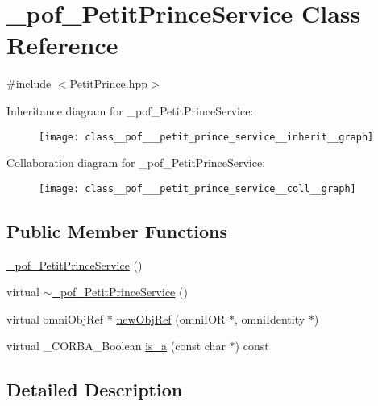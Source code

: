 \hypertarget{class__pof___petit_prince_service}{}\section{\+\_\+pof\+\_\+\+Petit\+Prince\+Service Class Reference}
\label{class__pof___petit_prince_service}


{\ttfamily \#include $<$Petit\+Prince.\+hpp$>$}



Inheritance diagram for \+\_\+pof\+\_\+\+Petit\+Prince\+Service\+:
\nopagebreak
\begin{figure}[H]
\begin{center}
\leavevmode
\texttt{[image: class\_\_pof\_\_\_petit\_prince\_service\_\_inherit\_\_graph]}
\end{center}
\end{figure}


Collaboration diagram for \+\_\+pof\+\_\+\+Petit\+Prince\+Service\+:
\nopagebreak
\begin{figure}[H]
\begin{center}
\leavevmode
\texttt{[image: class\_\_pof\_\_\_petit\_prince\_service\_\_coll\_\_graph]}
\end{center}
\end{figure}
\subsection*{Public Member Functions}
\begin{DoxyCompactItemize}
\item 
\hyperlink{class__pof___petit_prince_service_a7a0313a18bc00a15e942f157f91b71a4}{\+\_\+pof\+\_\+\+Petit\+Prince\+Service} ()
\item 
virtual \hyperlink{class__pof___petit_prince_service_a6b090844c1622edbfc710950015af98f}{$\sim$\+\_\+pof\+\_\+\+Petit\+Prince\+Service} ()
\item 
virtual omni\+Obj\+Ref $\ast$ \hyperlink{class__pof___petit_prince_service_a46038a17c269d931f5bef9478b358d1c}{new\+Obj\+Ref} (omni\+I\+OR $\ast$, omni\+Identity $\ast$)
\item 
virtual \+\_\+\+C\+O\+R\+B\+A\+\_\+\+Boolean \hyperlink{class__pof___petit_prince_service_a2600fc827ae27237fe960e3231ed9182}{is\+\_\+a} (const char $\ast$) const 
\end{DoxyCompactItemize}


\subsection{Detailed Description}


